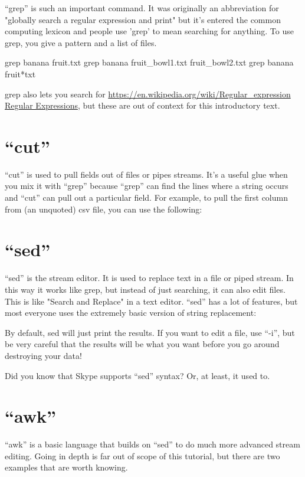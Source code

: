 ``grep'' is such an important command. It was originally an abbreviation for
"globally search a regular expression and print" but it's entered the common
computing lexicon and people use 'grep' to mean searching for anything. To use
grep, you give a pattern and a list of files.

\begin{prompt}
grep banana fruit.txt
grep banana fruit_bowl1.txt fruit_bowl2.txt
grep banana fruit*txt
\end{prompt}

grep also lets you search for
\url{https://en.wikipedia.org/wiki/Regular_expression Regular Expressions}, but
these are out of context for this introductory text.

\section{``cut''} ``cut'' is used to pull fields out of files or pipes streams.
It's a useful glue when you mix it with ``grep'' because ``grep'' can find the
lines where a string occurs and ``cut'' can pull out a particular field. For
example, to pull the first column from (an unquoted) csv file, you can use the
following:

\begin{prompt}
\end{prompt}

\section{``sed''} ``sed'' is the stream editor. It is used to replace text in a
file or piped stream. In this way it works like grep, but instead of just
searching, it can also edit files. This is like "Search and Replace" in a text
editor. ``sed'' has a lot of features, but most everyone uses the extremely
basic version of string replacement:

\begin{prompt}
\end{prompt}

By default, sed will just print the results. If you want to edit a file, use
``-i'', but be very careful that the results will be what you want before you go
around destroying your data!

Did you know that Skype supports ``sed'' syntax? Or, at least, it used to.

\section{``awk''}
``awk'' is a basic language that builds on ``sed'' to do much more advanced
stream editing. Going in depth is far out of scope of this tutorial, but there
are two examples that are worth knowing.

